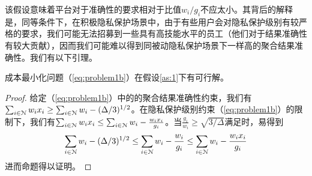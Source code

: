 	\noindent  该假设意味着平台对于准确性的要求相对于比值$w_i/g_i$不应太小。其背后的解释是，同等条件下，在积极隐私保护场景中，由于有些用户会对隐私保护级别有较严格的要求，我们可能无法招募到一些具有高技能水平的员工（他们对于结果准确性有较大贡献），因而我们可能难以得到同被动隐私保护场景下一样高的聚合结果准确性。我们有以下引理。
	
	
	
	\begin{lm}\label{lm:lm3}
	成本最小化问题（\ref{eq:problem1b}）在假设\ref{as:1}下有可行解。
	\end{lm}
	\begin{proof}
	给定（\ref{eq:problem1b}）中的的聚合结果准确性约束，我们有$\sum_{i\in\mathcal{N}}w_ix_i\geq \sum_{i\in\mathcal{N}}w_i-(\Delta/3)^{1/2}$。在隐私保护级别约束（\ref{eq:problem1b}）的限制下，我们有$\sum_{i\in\mathcal{N}}w_ix_i\leq \sum_{i\in\mathcal{N}}w_i-\frac{w_ix_i}{g_i}$。当$\frac{g_i}{w_i}\geq \sqrt{3/\Delta}$满足时，易得到
	\[\sum_{i\in\mathcal{N}}w_i-(\Delta/3)^{1/2}\leq \sum_{i\in\mathcal{N}}w_i-\frac{w_i}{g_i}\leq \sum_{i\in\mathcal{N}}w_i-\frac{w_ix_i}{g_i}\]
	进而命题得以证明。
	\end{proof}


	
	

